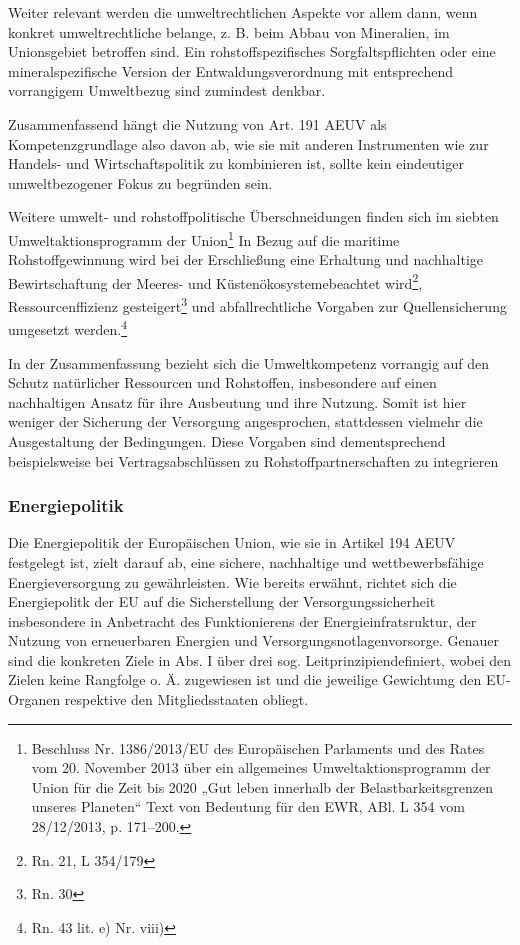 \documentclass[12pt,a4paper,oneside]{book} %
\begin{document}
Weiter relevant werden die umweltrechtlichen Aspekte vor allem dann, wenn konkret umweltrechtliche belange, z. B. beim Abbau von Mineralien, im Unionsgebiet betroffen sind. Ein rohstoffspezifisches Sorgfaltspflichten oder eine mineralspezifische Version der Entwaldungsverordnung mit entsprechend vorrangigem Umweltbezug sind zumindest denkbar.
	
Zusammenfassend hängt die Nutzung von Art. 191 AEUV als Kompetenzgrundlage also davon ab, wie sie mit anderen Instrumenten wie zur Handels- und Wirtschaftspolitik zu kombinieren ist, sollte kein eindeutiger umweltbezogener Fokus zu begründen sein.

Weitere umwelt- und rohstoffpolitische Überschneidungen finden sich im siebten Umweltaktionsprogramm der Union\footnote{Beschluss Nr. 1386/2013/EU des Europäischen Parlaments und des Rates vom 20. November 2013 über ein allgemeines Umweltaktionsprogramm der Union für die Zeit bis 2020 „Gut leben innerhalb der Belastbarkeitsgrenzen unseres Planeten“ Text von Bedeutung für den EWR, ABl. L 354 vom 28/12/2013, p. 171–200.} In Bezug auf die maritime Rohstoffgewinnung wird bei der Erschließung eine \glqq Erhaltung und nachhaltige Bewirtschaftung der Meeres- und Küstenökosysteme\glqq beachtet wird\footnote{Rn. 21, L 354/179}, Ressourcenffizienz gesteigert\footnote{Rn. 30} und abfallrechtliche Vorgaben zur Quellensicherung umgesetzt werden.\footnote{Rn. 43 lit. e) Nr. viii)}
	


In der Zusammenfassung bezieht sich die Umweltkompetenz vorrangig auf den Schutz natürlicher Ressourcen und Rohstoffen, insbesondere auf einen nachhaltigen Ansatz für ihre Ausbeutung und ihre Nutzung. Somit ist hier weniger der Sicherung der Versorgung angesprochen, stattdessen vielmehr die Ausgestaltung der Bedingungen. Diese Vorgaben sind dementsprechend beispielsweise bei Vertragsabschlüssen zu Rohstoffpartnerschaften zu integrieren
	
	
	
\subsubsection{Energiepolitik}
Die Energiepolitik der Europäischen Union, wie sie in Artikel 194 AEUV festgelegt ist, zielt darauf ab, eine sichere, nachhaltige und wettbewerbsfähige Energieversorgung zu gewährleisten. Wie bereits erwähnt, richtet sich die Energiepolitk der EU auf die Sicherstellung der Versorgungssicherheit insbesondere in Anbetracht des Funktionierens der Energieinfratsruktur, der Nutzung von erneuerbaren Energien und Versorgungsnotlagenvorsorge.\autocite[387]{frau_rohstoffe_2025} Genauer sind die konkreten Ziele in Abs. I über drei sog. \glqq Leitprinzipien\grqq definiert, wobei den Zielen keine Rangfolge o. Ä. zugewiesen ist und die jeweilige Gewichtung den EU-Organen respektive den Mitgliedsstaaten obliegt.\autocite[Gundel § M Rn. 26 27]{dauses_handbuch_2024} 
\end{document}
